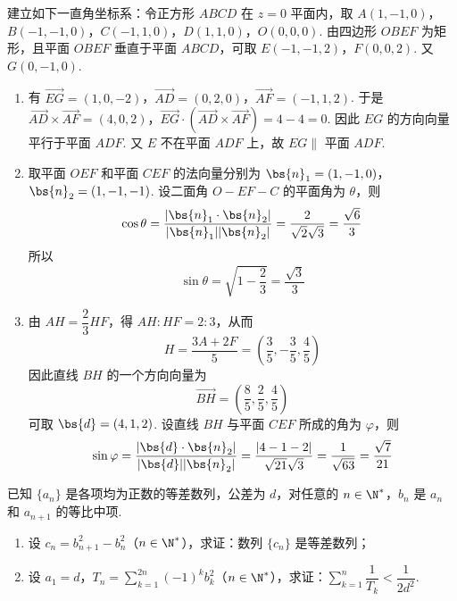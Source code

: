 \begin{solution}
建立如下一直角坐标系：令正方形 \(ABCD\) 在 \(z=0\) 平面内，取
\(A(1,-1,0)\)，\(B(-1,-1,0)\)，\(C(-1,1,0)\)，\(D(1,1,0)\)，\(O(0,0,0)\).
由四边形 \(OBEF\) 为矩形，且平面 \(OBEF\) 垂直于平面 \(ABCD\)，可取
\(E(-1,-1,2)\)，\(F(0,0,2)\). 又 \(G(0,-1,0)\).

\begin{enumerate}
\item 有
\(\overrightarrow{EG}=(1,0,-2)\)，\(\overrightarrow{AD}=(0,2,0)\)，\(\overrightarrow{AF}=(-1,1,2)\).
于是
\(\overrightarrow{AD}\times\overrightarrow{AF}=(4,0,2)\)，\(\overrightarrow{EG}\cdot\left(\overrightarrow{AD}\times\overrightarrow{AF}\right)=4-4=0\).
因此 \(EG\) 的方向向量平行于平面 \(ADF\). 又 \(E\) 不在平面 \(ADF\) 上，故 \(EG\parallel\) 平面 \(ADF\).

\item 取平面 \(OEF\) 和平面 \(CEF\) 的法向量分别为
\(\bs{n}_1=(1,-1,0)\)，\(\bs{n}_2=(1,-1,-1)\).
设二面角 \(O-EF-C\) 的平面角为 \(\theta\)，则
\[
\cos\theta=\frac{|\bs{n}_1\cdot\bs{n}_2|}{|\bs{n}_1||\bs{n}_2|}
 =\frac2{\sqrt2\sqrt3}=\frac{\sqrt6}{3}
\]
所以
\[
\sin\theta=\sqrt{1-\frac{2}{3}}=\frac{\sqrt3}{3}
\]

\item 由 \(AH=\dfrac23HF\)，得 \(AH:HF=2:3\)，从而
\[
H=\frac{3A+2F}{5}=\left(\frac35,-\frac35,\frac45\right)
\]
因此直线 \(BH\) 的一个方向向量为
\[
\overrightarrow{BH}=\left(\frac85,\frac25,\frac45\right)
\]
可取 \(\bs{d}=(4,1,2)\). 设直线 \(BH\) 与平面 \(CEF\) 所成的角为 \(\varphi\)，则
\[
\sin\varphi=\frac{|\bs{d}\cdot\bs{n}_2|}{|\bs{d}||\bs{n}_2|}
 =\frac{|4-1-2|}{\sqrt{21}\sqrt3}=\frac1{\sqrt{63}}=\frac{\sqrt7}{21}
\]
\end{enumerate}
\end{solution}

\begin{problem}
已知 \(\{a_n\}\) 是各项均为正数的等差数列，公差为 \(d\)，对任意的 \(n\in\N^*\)，\(b_n\) 是 \(a_n\) 和 \(a_{n+1}\) 的等比中项.

\begin{enumerate}
\item 设 \(c_n=b_{n+1}^2-b_n^2\)（\(n\in\N^*\)），求证：数列 \(\{c_n\}\) 是等差数列；
\item 设 \(a_1=d\)，\(T_n=\displaystyle\sum_{k=1}^{2n}(-1)^k b_k^2\)（\(n\in\N^*\)），求证：\(\displaystyle\sum_{k=1}^n\dfrac1{T_k}<\dfrac1{2d^2}\).
\end{enumerate}
\end{problem}

